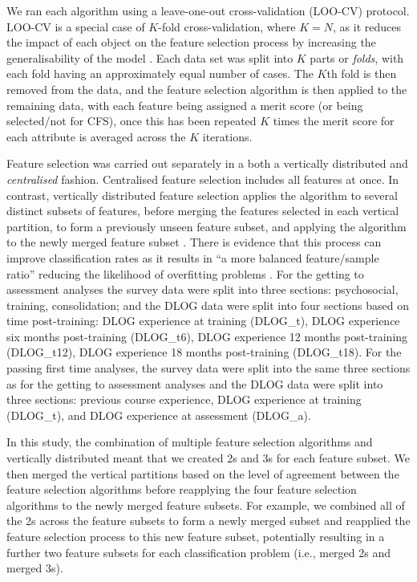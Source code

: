 \documentclass[
  12pt,
  a4paper,
]{book}
\begin{document}
We ran each algorithm using a leave-one-out cross-validation (LOO-CV) protocol. LOO-CV is a special case of \(K\)-fold cross-validation, where \(K = N\), as it reduces the impact of each object on the feature selection process by increasing the generalisability of the model \citep{Hastie2009, DeRooij2020}. Each data set was split into \(K\) parts or \emph{folds}, with each fold having an approximately equal number of cases. The \(K\)th fold is then removed from the data, and the feature selection algorithm is then applied to the remaining data, with each feature being assigned a merit score (or being selected/not for CFS), once this has been repeated \(K\) times the merit score for each attribute is averaged across the \(K\) iterations.

Feature selection was carried out separately in a both a vertically distributed and \emph{centralised} fashion. Centralised feature selection includes all features at once. In contrast, vertically distributed feature selection applies the algorithm to several distinct subsets of features, before merging the features selected in each vertical partition, to form a previously unseen feature subset, and applying the algorithm to the newly merged feature subset \citep[see][]{Bolon-Canedo2015}. There is evidence that this process can improve classification rates as it results in ``a more balanced feature/sample ratio'' reducing the likelihood of overfitting problems \citep[p 137]{Bolon-Canedo2015a}. For the getting to assessment analyses the survey data were split into three sections: psychosocial, training, consolidation; and the DLOG data were split into four sections based on time post-training: DLOG experience at training (DLOG\_t), DLOG experience six months post-training (DLOG\_t6), DLOG experience 12 months post-training (DLOG\_t12), DLOG experience 18 months post-training (DLOG\_t18). For the passing first time analyses, the survey data were split into the same three sections as for the getting to assessment analyses and the DLOG data were split into three sections: previous course experience, DLOG experience at training (DLOG\_t), and DLOG experience at assessment (DLOG\_a).

In this study, the combination of multiple feature selection algorithms and vertically distributed meant that we created 2s and 3s for each feature subset. We then merged the vertical partitions based on the level of agreement between the feature selection algorithms before reapplying the four feature selection algorithms to the newly merged feature subsets. For example, we combined all of the 2s across the feature subsets to form a newly merged subset and reapplied the feature selection process to this new feature subset, potentially resulting in a further two feature subsets for each classification problem (i.e., merged 2s and merged 3s).
\end{document}
